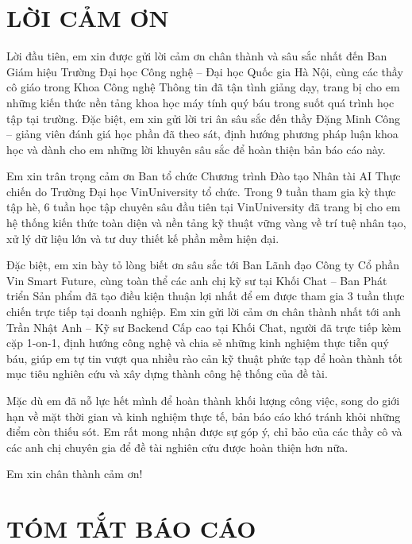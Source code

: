 \documentclass[12pt,a4paper,oneside]{report}
\begin{document}
\newpage
{}
\setcounter{page}{1}

\chapter*{LỜI CẢM ƠN}

Lời đầu tiên, em xin được gửi lời cảm ơn chân thành và sâu sắc nhất đến Ban Giám hiệu Trường Đại học Công nghệ -- Đại học Quốc gia Hà Nội, cùng các thầy cô giáo trong Khoa Công nghệ Thông tin đã tận tình giảng dạy, trang bị cho em những kiến thức nền tảng khoa học máy tính quý báu trong suốt quá trình học tập tại trường. Đặc biệt, em xin gửi lời tri ân sâu sắc đến thầy Đặng Minh Công -- giảng viên đánh giá học phần đã theo sát, định hướng phương pháp luận khoa học và dành cho em những lời khuyên sâu sắc để hoàn thiện bản báo cáo này.

Em xin trân trọng cảm ơn Ban tổ chức Chương trình Đào tạo Nhân tài AI Thực chiến do Trường Đại học VinUniversity tổ chức. Trong 9 tuần tham gia kỳ thực tập hè, 6 tuần học tập chuyên sâu đầu tiên tại VinUniversity đã trang bị cho em hệ thống kiến thức toàn diện và nền tảng kỹ thuật vững vàng về trí tuệ nhân tạo, xử lý dữ liệu lớn và tư duy thiết kế phần mềm hiện đại.

Đặc biệt, em xin bày tỏ lòng biết ơn sâu sắc tới Ban Lãnh đạo Công ty Cổ phần Vin Smart Future, cùng toàn thể các anh chị kỹ sư tại Khối Chat -- Ban Phát triển Sản phẩm đã tạo điều kiện thuận lợi nhất để em được tham gia 3 tuần thực chiến trực tiếp tại doanh nghiệp. Em xin gửi lời cảm ơn chân thành nhất tới anh Trần Nhật Anh -- Kỹ sư Backend Cấp cao tại Khối Chat, người đã trực tiếp kèm cặp 1-on-1, định hướng công nghệ và chia sẻ những kinh nghiệm thực tiễn quý báu, giúp em tự tin vượt qua nhiều rào cản kỹ thuật phức tạp để hoàn thành tốt mục tiêu nghiên cứu và xây dựng thành công hệ thống của đề tài.

Mặc dù em đã nỗ lực hết mình để hoàn thành khối lượng công việc, song do giới hạn về mặt thời gian và kinh nghiệm thực tế, bản báo cáo khó tránh khỏi những điểm còn thiếu sót. Em rất mong nhận được sự góp ý, chỉ bảo của các thầy cô và các anh chị chuyên gia để đề tài nghiên cứu được hoàn thiện hơn nữa.

Em xin chân thành cảm ơn!

\newpage
\chapter*{TÓM TẮT BÁO CÁO}
\end{document}
